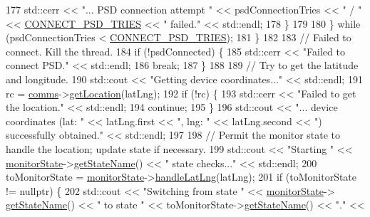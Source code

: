 \begin{DoxyCode}
177                     std::cerr << \textcolor{stringliteral}{"... PSD connection attempt "} << psdConnectionTries << \textcolor{stringliteral}{" / "} << 
      \hyperlink{_monitor_8cpp_af5cf22b2d85959f36b7e007da57eaf37}{CONNECT\_PSD\_TRIES} << \textcolor{stringliteral}{" failed."} << std::endl;
178                 \}
179 
180             \} \textcolor{keywordflow}{while} (psdConnectionTries < \hyperlink{_monitor_8cpp_af5cf22b2d85959f36b7e007da57eaf37}{CONNECT\_PSD\_TRIES});
181         \}
182 
183         \textcolor{comment}{// Failed to connect. Kill the thread.}
184         \textcolor{keywordflow}{if} (!psdConnected) \{
185             std::cerr << \textcolor{stringliteral}{"Failed to connect PSD."} << std::endl;
186             \textcolor{keywordflow}{break};
187         \}
188 
189         \textcolor{comment}{// Try to get the latitude and longitude.}
190         std::cout << \textcolor{stringliteral}{"Getting device coordinates..."} << std::endl;
191         rc = \hyperlink{class_monitor_a42fffadeba33ae6080b1d95783ca703b}{comms}->\hyperlink{class_comms_a26030245503e82aa6278e39cd0886c31}{getLocation}(latLng);
192         \textcolor{keywordflow}{if} (!rc) \{
193             std::cerr << \textcolor{stringliteral}{"Failed to get the location."} << std::endl;
194             \textcolor{keywordflow}{continue};
195         \}
196         std::cout << \textcolor{stringliteral}{"... device coordinates (lat: "} << latLng.first << \textcolor{stringliteral}{", lng: "} << latLng.second << \textcolor{stringliteral}{")
       successfully obtained."} << std::endl;
197 
198         \textcolor{comment}{// Permit the monitor state to handle the location; update state if necessary.}
199         std::cout << \textcolor{stringliteral}{"Starting "} << \hyperlink{class_monitor_a56b40e06ac7f2f36520e82ee01a17d4c}{monitorState}->\hyperlink{class_monitor_state_acb6d3a4de174058cb5b167fc04929ddb}{getStateName}() << \textcolor{stringliteral}{" state
       checks..."} << std::endl;
200         toMonitorState = \hyperlink{class_monitor_a56b40e06ac7f2f36520e82ee01a17d4c}{monitorState}->\hyperlink{class_monitor_state_a8c8b871e3e8308e11f35905dd8741878}{handleLatLng}(latLng);
201         \textcolor{keywordflow}{if} (toMonitorState != \textcolor{keyword}{nullptr}) \{
202             std::cout << \textcolor{stringliteral}{"Switching from state "} << \hyperlink{class_monitor_a56b40e06ac7f2f36520e82ee01a17d4c}{monitorState}->
      \hyperlink{class_monitor_state_acb6d3a4de174058cb5b167fc04929ddb}{getStateName}() << \textcolor{stringliteral}{" to state "} << toMonitorState->\hyperlink{class_monitor_state_acb6d3a4de174058cb5b167fc04929ddb}{getStateName}() << \textcolor{stringliteral}{"."} << 

\end{DoxyCode}
